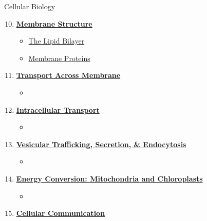 \documentclass[12pt,letterpaper]{article}
\begin{document}

\begin{chapbox}{Cellular Biology}{ 
\begin{enumerate}[font=\bfseries, wide]
    \setcounter{enumi}{9}
    \item \hyperlink{10}{\textbf{Membrane Structure}}
    \begin{itemize}
        \item \hyperlink{10.1}{The Lipid Bilayer}
        \item \hyperlink{10.2}{Membrane Proteins}
    \end{itemize}
    \item \hyperlink{11}{\textbf{Transport Across Membrane}}
    \begin{itemize}
        \item
    \end{itemize}
    \item \hyperlink{12}{\textbf{Intracellular Transport}}
    \begin{itemize}
        \item 
    \end{itemize}
    \item \hyperlink{13}{\textbf{Vesicular Trafficking, Secretion, \& Endocytosis}}
    \begin{itemize}
        \item
    \end{itemize}
    \item \hyperlink{14}{\textbf{Energy Conversion: Mitochondria and Chloroplasts}}
    \begin{itemize}
        \item 
    \end{itemize}
    \item \hyperlink{15}{\textbf{Cellular Communication}}

\end{enumerate}}
\end{chapbox}
\end{document}
